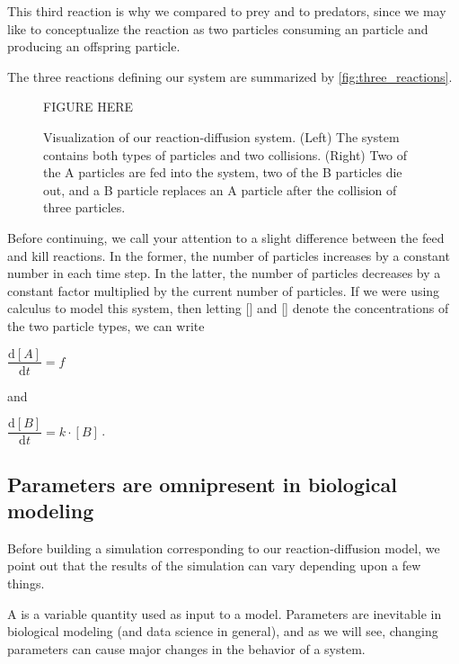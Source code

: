 This third reaction is why we compared  to prey and  to predators, since we may like to conceptualize the reaction as two  particles consuming an  particle and producing an offspring  particle.

The three reactions defining our system are summarized by \autoref{fig:three_reactions}.\\

\begin{figure}[h]
\centering
\mySfFamily
FIGURE HERE
\caption{Visualization of our reaction-diffusion system. (Left) The system contains both types of particles and two collisions. (Right) Two of the A particles are fed into the system, two of the B particles die out, and a B particle replaces an A particle after the collision of three particles.}
\label{fig:three_reactions}
\end{figure}

Before continuing, we call your attention to a slight difference between the feed and kill reactions. In the former, the number of  particles increases by a constant number in each time step. In the latter, the number of  particles decreases by a constant factor multiplied by the current number of  particles. If we were using calculus to model this system, then letting [] and [] denote the concentrations of the two particle types, we can write

\begin{center}
$\dfrac{\mathrm{d}[A]}{\mathrm{d}t} = f$
\end{center}

\noindent and

\begin{center}
$\dfrac{\mathrm{d}[B]}{\mathrm{d}t} = k \cdot [B]$\,.
\end{center}

\FloatBarrier
{}
\subsection{Parameters are omnipresent in biological modeling}

Before building a simulation corresponding to our reaction-diffusion model, we point out that the results of the simulation can vary depending upon a few things.

A  is a variable quantity used as input to a model. Parameters are inevitable in biological modeling (and data science in general), and as we will see, changing parameters can cause major changes in the behavior of a system.


